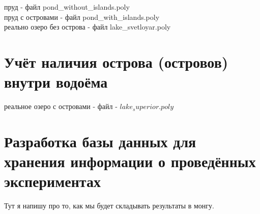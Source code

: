 \documentclass[14pt]{extreport}
\begin{document}
пруд - файл pond_without_islands.poly \\
пруд с островами - файл pond_with_islands.poly \\
реально озеро без острова - файл lake_svetloyar.poly



\chapter{Учёт наличия острова (островов) внутри водоёма}

реальное озеро с островами - файл - $lake_superior.poly$


\chapter{Разработка базы данных для хранения информации о проведённых экспериментах}

Тут я напишу про то, как мы будет складывать результаты в монгу.





\end{document}
